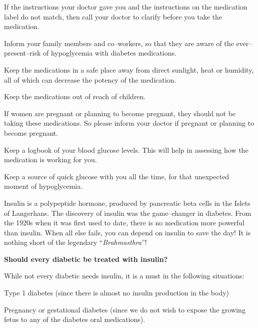  \item If the instructions your doctor gave you and the instructions on the medication label do not match, then call your doctor to clarify before you take the medication.

 \item Inform your family members and co–workers, so that they are aware of the ever–present–risk of hypoglycemia with diabetes medications.

 \item Keep the medications in a safe place away from direct sunlight, heat or humidity, all of which can decrease the potency of the medication.

 \item Keep the medications out of reach of children.

 \item If women are pregnant or planning to become pregnant, they should not be taking these medications. So please inform your doctor if pregnant or planning to become pregnant.

 \item Keep a logbook of your blood glucose levels. This will help in assessing how the medication is working for you.

 \item Keep a source of quick glucose with you all the time, for that unexpected moment of hypoglycemia.


Insulin is a polypeptide hormone, produced by pancreatic beta cells in the Islets of Langerhans. The discovery of insulin was the game–changer in diabetes. From the 1920s when it was first used to date, there is no medication more powerful than insulin. When all else fails, you can depend on insulin to save the day! It is nothing short of the legendary “\textit{Brahmasthra}”!

\textbf{Should every diabetic be treated with insulin?}

While not every diabetic needs insulin, it is a must in the following situations:

\item Type 1 diabetes (since there is almost no insulin production in the body)

 \item Pregnancy or gestational diabetes (since we do not wish to expose the growing fetus to any of the diabetes oral medications).

